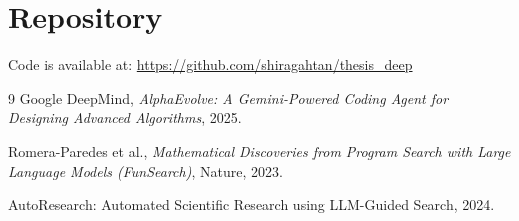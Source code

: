 \documentclass[11pt,a4paper]{article}
\begin{document}
\section{Repository}

Code is available at:
\url{https://github.com/shiragahtan/thesis_deep}

\begin{thebibliography}{9}
  Google DeepMind,
  \textit{AlphaEvolve: A Gemini-Powered Coding Agent for Designing Advanced Algorithms},
  2025.

  Romera-Paredes et al.,
  \textit{Mathematical Discoveries from Program Search with Large Language Models (FunSearch)},
  Nature, 2023.

  AutoResearch: Automated Scientific Research using LLM-Guided Search,
  2024.
\end{thebibliography}
\end{document}
